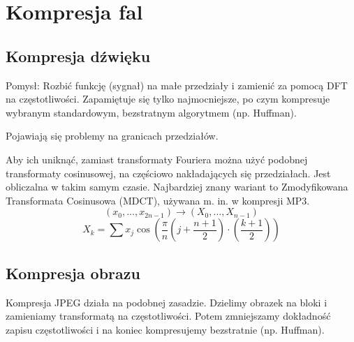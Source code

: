 \section{Kompresja fal}
\subsection{Kompresja dźwięku}
Pomysł: Rozbić funkcję (sygnał) na małe przedziały i zamienić za pomocą DFT na częstotliwości. Zapamiętuje się tylko najmocniejsze, po czym kompresuje wybranym standardowym, bezstratnym algorytmem (np. Huffman).
\begin{warning}
	Pojawiają się problemy na granicach przedziałów.
\end{warning}
Aby ich uniknąć, zamiast transformaty Fouriera można użyć podobnej transformaty cosinusowej, na częściowo nakładających się przedziałach. Jest obliczalna w takim samym czasie. Najbardziej znany wariant to Zmodyfikowana Transformata Cosinusowa (MDCT), używana m. in. w kompresji MP3.
\[
	(x_0, \dots, x_{2n-1}) \rightarrow (X_0, \dots, X_{n-1})
\]
\[
	X_k = \sum x_j \cos\left(\frac{\pi}{n}\left(j + \frac{n + 1}{2}\right)\cdot\left(\frac{k+1}{2}\right)\right)
\]
\subsection{Kompresja obrazu}
Kompresja JPEG działa na podobnej zasadzie. Dzielimy obrazek na bloki i zamieniamy transformatą na częstotliwości. Potem zmniejszamy dokładność zapisu częstotliwości i na koniec kompresujemy bezstratnie (np. Huffman).